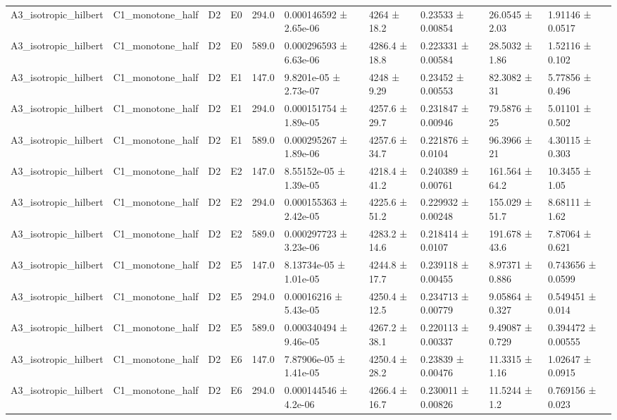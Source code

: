 \begin{table}
\begin{tabular}{llllllllll}
A3\_isotropic\_hilbert & C1\_monotone\_half & D2 & E0 & 294.0 & 0.000146592 ± 2.65e-06 & 4264 ± 18.2 & 0.23533 ± 0.00854 & 26.0545 ± 2.03 & 1.91146 ± 0.0517 \\
A3\_isotropic\_hilbert & C1\_monotone\_half & D2 & E0 & 589.0 & 0.000296593 ± 6.63e-06 & 4286.4 ± 18.8 & 0.223331 ± 0.00584 & 28.5032 ± 1.86 & 1.52116 ± 0.102 \\
A3\_isotropic\_hilbert & C1\_monotone\_half & D2 & E1 & 147.0 & 9.8201e-05 ± 2.73e-07 & 4248 ± 9.29 & 0.23452 ± 0.00553 & 82.3082 ± 31 & 5.77856 ± 0.496 \\
A3\_isotropic\_hilbert & C1\_monotone\_half & D2 & E1 & 294.0 & 0.000151754 ± 1.89e-05 & 4257.6 ± 29.7 & 0.231847 ± 0.00946 & 79.5876 ± 25 & 5.01101 ± 0.502 \\
A3\_isotropic\_hilbert & C1\_monotone\_half & D2 & E1 & 589.0 & 0.000295267 ± 1.89e-06 & 4257.6 ± 34.7 & 0.221876 ± 0.0104 & 96.3966 ± 21 & 4.30115 ± 0.303 \\
A3\_isotropic\_hilbert & C1\_monotone\_half & D2 & E2 & 147.0 & 8.55152e-05 ± 1.39e-05 & 4218.4 ± 41.2 & 0.240389 ± 0.00761 & 161.564 ± 64.2 & 10.3455 ± 1.05 \\
A3\_isotropic\_hilbert & C1\_monotone\_half & D2 & E2 & 294.0 & 0.000155363 ± 2.42e-05 & 4225.6 ± 51.2 & 0.229932 ± 0.00248 & 155.029 ± 51.7 & 8.68111 ± 1.62 \\
A3\_isotropic\_hilbert & C1\_monotone\_half & D2 & E2 & 589.0 & 0.000297723 ± 3.23e-06 & 4283.2 ± 14.6 & 0.218414 ± 0.0107 & 191.678 ± 43.6 & 7.87064 ± 0.621 \\
A3\_isotropic\_hilbert & C1\_monotone\_half & D2 & E5 & 147.0 & 8.13734e-05 ± 1.01e-05 & 4244.8 ± 17.7 & 0.239118 ± 0.00455 & 8.97371 ± 0.886 & 0.743656 ± 0.0599 \\
A3\_isotropic\_hilbert & C1\_monotone\_half & D2 & E5 & 294.0 & 0.00016216 ± 5.43e-05 & 4250.4 ± 12.5 & 0.234713 ± 0.00779 & 9.05864 ± 0.327 & 0.549451 ± 0.014 \\
A3\_isotropic\_hilbert & C1\_monotone\_half & D2 & E5 & 589.0 & 0.000340494 ± 9.46e-05 & 4267.2 ± 38.1 & 0.220113 ± 0.00337 & 9.49087 ± 0.729 & 0.394472 ± 0.00555 \\
A3\_isotropic\_hilbert & C1\_monotone\_half & D2 & E6 & 147.0 & 7.87906e-05 ± 1.41e-05 & 4250.4 ± 28.2 & 0.23839 ± 0.00476 & 11.3315 ± 1.16 & 1.02647 ± 0.0915 \\
A3\_isotropic\_hilbert & C1\_monotone\_half & D2 & E6 & 294.0 & 0.000144546 ± 4.2e-06 & 4266.4 ± 16.7 & 0.230011 ± 0.00826 & 11.5244 ± 1.2 & 0.769156 ± 0.023 \\

\end{tabular}
\end{table}
